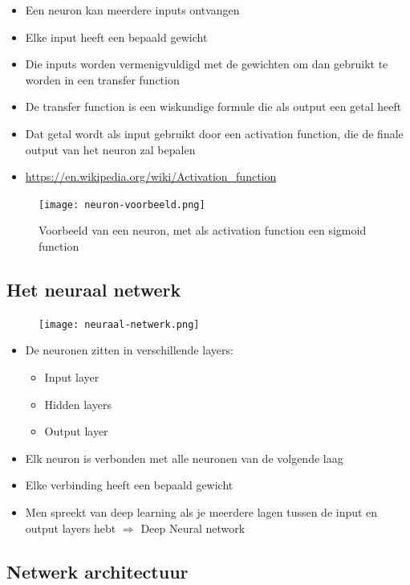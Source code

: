 \documentclass{article}
\begin{document}
\begin{itemize}
    \item Een neuron kan meerdere inputs ontvangen
    \item Elke input heeft een bepaald gewicht
    \item Die inputs worden vermenigvuldigd met de gewichten om dan gebruikt te worden in een transfer function
    \item De transfer function is een wiskundige formule die als output een getal heeft
    \item Dat getal wordt als input gebruikt door een activation function, die de finale output van het neuron zal bepalen
    \item \url{https://en.wikipedia.org/wiki/Activation_function}
\end{itemize}

\begin{figure}[H]
    \centering
    \texttt{[image: neuron-voorbeeld.png]}
    \caption{Voorbeeld van een neuron, met als activation function een sigmoid function}
\end{figure}

\subsection{Het neuraal netwerk}

\begin{figure}[H]
    \centering
    \texttt{[image: neuraal-netwerk.png]}
\end{figure}

\begin{itemize}
    \item De neuronen zitten in verschillende layers:
    \begin{itemize}
        \item Input layer
        \item Hidden layers
        \item Output layer
    \end{itemize}
    \item Elk neuron is verbonden met alle neuronen van de volgende laag
    \item Elke verbinding heeft een bepaald gewicht
    \item Men spreekt van deep learning als je meerdere lagen tussen de input en output layers hebt $\Rightarrow$ Deep Neural network
\end{itemize}

\subsection{Netwerk architectuur}
\end{document}
